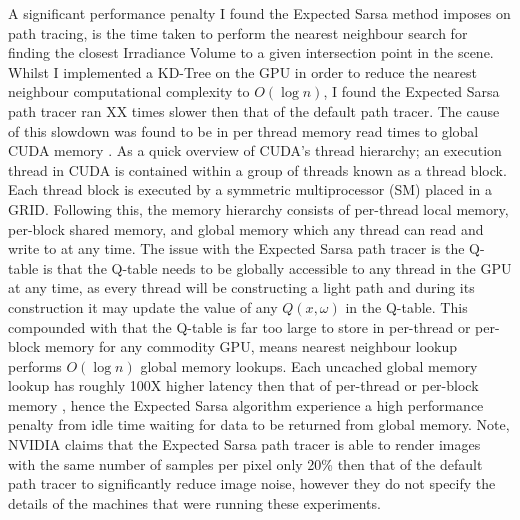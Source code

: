 \documentclass[../dissertation.tex]{subfiles}
\begin{document}
A significant performance penalty I found the Expected Sarsa method imposes on path tracing, is the time taken to perform the nearest neighbour search for finding the closest Irradiance Volume to a given intersection point in the scene. Whilst I implemented a KD-Tree on the GPU in order to reduce the nearest neighbour computational complexity to $O( \log n)$, I found the Expected Sarsa path tracer ran XX times slower then that of the default path tracer. The cause of this slowdown was found to be in per thread memory read times to global CUDA memory \cite{cuda_c_guide}. As a quick overview of CUDA's thread hierarchy; an execution thread in CUDA is contained within a group of threads known as a thread block. Each thread block is executed by a symmetric multiprocessor (SM) placed in a GRID. Following this, the memory hierarchy consists of per-thread local memory, per-block shared memory, and global memory which any thread can read and write to at any time. The issue with the Expected Sarsa path tracer is the Q-table is that the Q-table needs to be globally accessible to any thread in the GPU at any time, as every thread will be constructing a light path and during its construction it may update the value of any $Q(x, \omega)$ in the Q-table. This compounded with that the Q-table is far too large to store in per-thread or per-block memory for any commodity GPU, means nearest neighbour lookup performs $O(\log n)$ global memory lookups. Each uncached global memory lookup has roughly 100X higher latency then that of per-thread or per-block memory \cite{global_vs_shared}, hence the Expected Sarsa algorithm experience a high performance penalty from idle time waiting for data to be returned from global memory. Note, NVIDIA claims that the Expected Sarsa path tracer is able to render images with the same number of samples per pixel only 20\% then that of the default path tracer \cite{dahm2017learning} to significantly reduce image noise, however they do not specify the details of the machines that were running these experiments.\\
\end{document}
